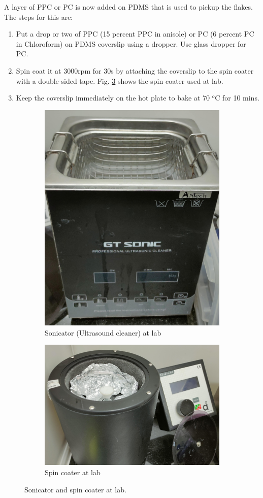 A layer of PPC or PC is now added on PDMS that is used to pickup the flakes. The steps for this are:
\begin{enumerate}
	\item Put a drop or two of PPC (15 percent PPC in anisole) or PC (6 percent PC in Chloroform) on PDMS coverslip using a dropper. Use glass dropper for PC.
	\item Spin coat it at 3000rpm for 30s by attaching the coverslip to the spin coater with a double-sided tape. Fig. \ref{fig:spco} shows the spin coater used at lab.
	\item Keep the coverslip immediately on the hot plate to bake at 70 $^o$C for 10 mins.
\end{enumerate}

\begin{figure}[H]
	\centering
	\begin{subfigure}{.5\linewidth}
		\centering
		\includegraphics[width=0.6\linewidth]{figures/soni}
		\caption{Sonicator (Ultrasound cleaner) at lab}
		\label{fig:soni}
	\end{subfigure}%
	\begin{subfigure}{.5\linewidth}
		\centering
		\includegraphics[width=0.8\linewidth]{figures/spco}
		\caption{Spin coater at lab}
		\label{fig:spco}
	\end{subfigure}
	\caption{Sonicator and spin coater at lab.}
\end{figure}

